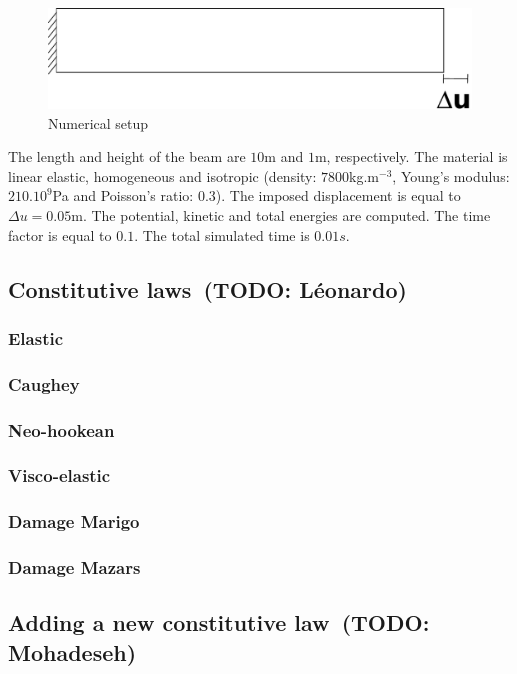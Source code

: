 \documentclass[a4paper,11pt]{book}
\newcommand{\todo}[1]{~({\small\color{red}\textbf{TODO: }\textbf{#1}})}
\begin{document}
\begin{figure}[!htb]
  \centering
  \includegraphics[scale=.6]{figures/explicit_dynamic}
  \caption{Numerical setup \label{fig:smm:explicit}}
\end{figure}

The length and height of the beam are $10$m and $1$m, respectively. The material is 
linear elastic, homogeneous and isotropic (density: $7800$kg.m$^{-3}$, Young's 
modulus: $210.10^{9}$Pa and Poisson's ratio: $0.3$). The imposed displacement is equal 
to $\Delta u = 0.05$m. The potential, kinetic and total energies are computed. 
The time factor is equal to $0.1$. The total simulated time is $0.01s$.

\subsection{Constitutive laws\todo{L\'eonardo}}
\subsubsection{Elastic}
\subsubsection{Caughey}
\subsubsection{Neo-hookean}
\subsubsection{Visco-elastic}
\subsubsection{Damage Marigo}
\subsubsection{Damage Mazars}

\subsection{Adding a new constitutive law\todo{Mohadeseh}}
\end{document}
